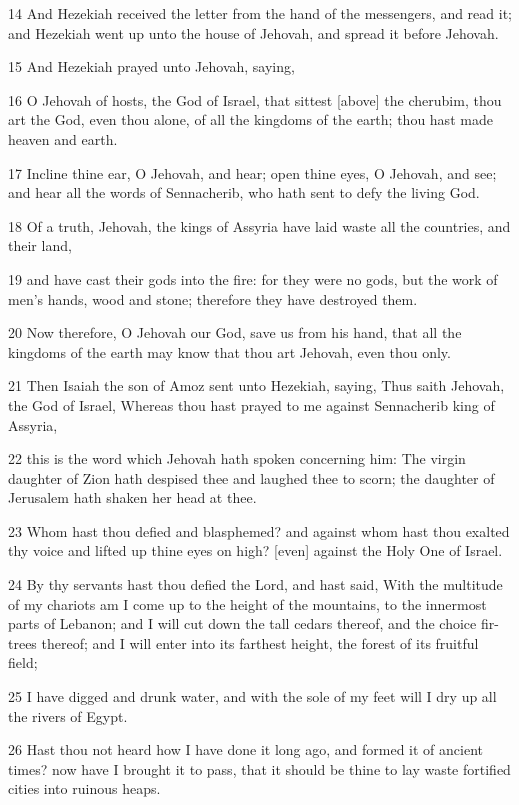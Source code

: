 \par 14 And Hezekiah received the letter from the hand of the messengers, and read it; and Hezekiah went up unto the house of Jehovah, and spread it before Jehovah.
\par 15 And Hezekiah prayed unto Jehovah, saying,
\par 16 O Jehovah of hosts, the God of Israel, that sittest [above] the cherubim, thou art the God, even thou alone, of all the kingdoms of the earth; thou hast made heaven and earth.
\par 17 Incline thine ear, O Jehovah, and hear; open thine eyes, O Jehovah, and see; and hear all the words of Sennacherib, who hath sent to defy the living God.
\par 18 Of a truth, Jehovah, the kings of Assyria have laid waste all the countries, and their land,
\par 19 and have cast their gods into the fire: for they were no gods, but the work of men's hands, wood and stone; therefore they have destroyed them.
\par 20 Now therefore, O Jehovah our God, save us from his hand, that all the kingdoms of the earth may know that thou art Jehovah, even thou only.
\par 21 Then Isaiah the son of Amoz sent unto Hezekiah, saying, Thus saith Jehovah, the God of Israel, Whereas thou hast prayed to me against Sennacherib king of Assyria,
\par 22 this is the word which Jehovah hath spoken concerning him: The virgin daughter of Zion hath despised thee and laughed thee to scorn; the daughter of Jerusalem hath shaken her head at thee.
\par 23 Whom hast thou defied and blasphemed? and against whom hast thou exalted thy voice and lifted up thine eyes on high? [even] against the Holy One of Israel.
\par 24 By thy servants hast thou defied the Lord, and hast said, With the multitude of my chariots am I come up to the height of the mountains, to the innermost parts of Lebanon; and I will cut down the tall cedars thereof, and the choice fir-trees thereof; and I will enter into its farthest height, the forest of its fruitful field;
\par 25 I have digged and drunk water, and with the sole of my feet will I dry up all the rivers of Egypt.
\par 26 Hast thou not heard how I have done it long ago, and formed it of ancient times? now have I brought it to pass, that it should be thine to lay waste fortified cities into ruinous heaps.
